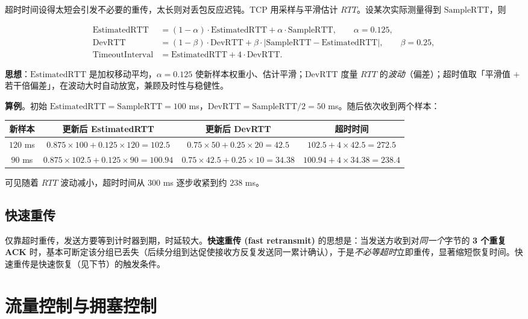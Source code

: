 超时时间设得太短会引发不必要的重传，太长则对丢包反应迟钝。TCP 用采样与平滑估计 $RTT$。设某次实际测量得到 $\text{SampleRTT}$，则

\begin{align}
    \text{EstimatedRTT} &= (1-\alpha)\cdot\text{EstimatedRTT} + \alpha\cdot\text{SampleRTT}, \qquad \alpha = 0.125, \\
    \text{DevRTT} &= (1-\beta)\cdot\text{DevRTT} + \beta\cdot|\text{SampleRTT} - \text{EstimatedRTT}|, \qquad \beta = 0.25, \\
    \text{TimeoutInterval} &= \text{EstimatedRTT} + 4\cdot\text{DevRTT}.
    \label{eq:timeout}
\end{align}

\textbf{思想}：$\text{EstimatedRTT}$ 是加权移动平均，$\alpha=0.125$ 使新样本权重小、估计平滑；$\text{DevRTT}$ 度量 $RTT$ 的\emph{波动}（偏差）；超时值取「平滑值 $+$ 若干倍偏差」，在波动大时自动放宽，兼顾及时性与稳健性。

\textbf{算例}。初始 $\text{EstimatedRTT}=\text{SampleRTT}=100$ ms，$\text{DevRTT}=\text{SampleRTT}/2=50$ ms。随后依次收到两个样本：

\begin{tabulary}{\textwidth}{CCCC}
\toprule
新样本 & 更新后 EstimatedRTT & 更新后 DevRTT & 超时时间 \\
\midrule
$120$ ms & $0.875\times100+0.125\times120=102.5$ & $0.75\times50+0.25\times20=42.5$ & $102.5+4\times42.5=272.5$ \\
$90$ ms & $0.875\times102.5+0.125\times90=100.94$ & $0.75\times42.5+0.25\times10=34.38$ & $100.94+4\times34.38=238.4$ \\
\bottomrule
\end{tabulary}

可见随着 $RTT$ 波动减小，超时时间从 $300$ ms 逐步收紧到约 $238$ ms。

\subsection{快速重传}

仅靠超时重传，发送方要等到计时器到期，时延较大。\textbf{快速重传 (fast retransmit)} 的思想是：当发送方收到对\emph{同一个}字节的 \textbf{3 个重复 ACK} 时，基本可断定该分组已丢失（后续分组到达促使接收方反复发送同一累计确认），于是\emph{不必等超时}立即重传，显著缩短恢复时间。快速重传是快速恢复（见下节）的触发条件。

\section{流量控制与拥塞控制}

